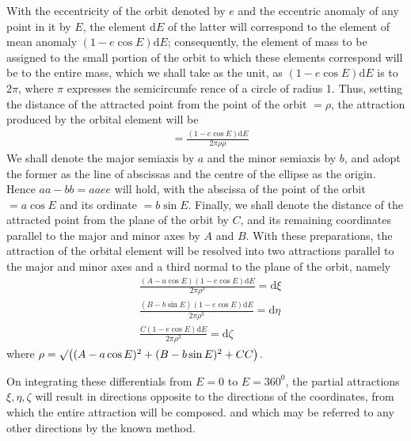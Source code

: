 With the eccentricity of the orbit denoted by $e$ and the eccentric anomaly of any point in it by $E$, the element $\mathrm{d}E$ of the latter will correspond to the element of mean anomaly $(1-e\cos E)\mathrm{d}E$; consequently, the element of mass to be assigned to the small portion of the orbit to which these elements correspond will be to the entire mass, which we shall take as the unit, as $(1-e\cos E)\mathrm{d}E$ is to $2\pi$, where $\pi$ expresses the semicircumfe%
rence of a circle of radius 1. Thus, setting the distance of the attracted point from the point of the orbit $=\rho$, the attraction produced by the orbital element will be
\[
\begin{aligned}
&=\frac{(1-e\cos E)\mathrm{d}E}{2\pi\rho\rho}
\end{aligned}
\]
We shall denote the major semiaxis by $a$ and the minor semiaxis by $b$, and adopt the former as the line of abscissas and the centre of the ellipse as the origin. Hence $aa-bb=aaee$ will hold, with the abscissa of the point of the orbit $=a\cos E$ and its ordinate $=b\sin E$. Finally, we shall denote the distance of the attracted point from the plane of the orbit by $C$, and its remaining coordinates parallel to the major and minor axes by $A$ and $B$. With these preparations, the attraction of the orbital element will be resolved into two attractions parallel to the major and minor axes and a third normal to the plane of the orbit, namely
\[
\begin{aligned}
&\frac{(A-a\cos E)(1-e\cos E)\mathrm{d}E}{2\pi\rho^3}=\mathrm{d}\xi\\[6pt]
&\frac{(B-b\sin E)(1-e\cos E)\mathrm{d}E}{2\pi\rho^3}=\mathrm{d}\eta\\[6pt]
&\frac{C(1-e\cos E)\mathrm{d}E}{2\pi\rho^3}=\mathrm{d}\zeta
\end{aligned}
\]
where $\rho=\surd\bigl((A-a\cos E)^2+(B-b\sin E)^2+CC\bigr)$.

On integrating these differentials from $E=0$ to $E=360^{0}$, the partial attractions $\xi,\eta,\zeta$ will result in directions opposite to the directions of the coordinates, from which the entire attraction will be composed. and which may be referred to any other directions by the known method.


\clearpage
\endgroup
